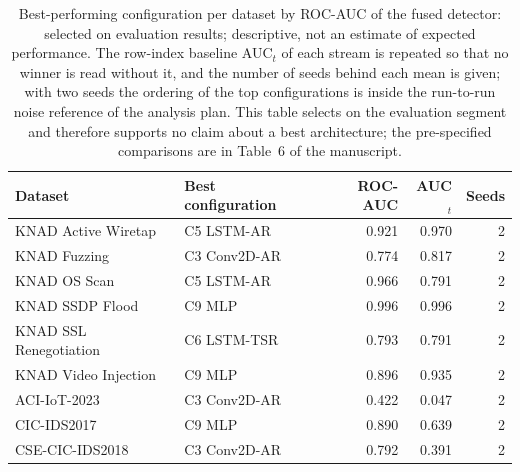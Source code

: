 \begin{table}[t]
  \centering
  \footnotesize
  \begin{tabular}{@{}llrrr@{}}
  \toprule
  Dataset & Best configuration & ROC-AUC & AUC$_t$ & Seeds \\
  \midrule
  KNAD Active Wiretap & C5 LSTM-AR & 0.921 & 0.970 & 2 \\
  KNAD Fuzzing & C3 Conv2D-AR & 0.774 & 0.817 & 2 \\
  KNAD OS Scan & C5 LSTM-AR & 0.966 & 0.791 & 2 \\
  KNAD SSDP Flood & C9 MLP & 0.996 & 0.996 & 2 \\
  KNAD SSL Renegotiation & C6 LSTM-TSR & 0.793 & 0.791 & 2 \\
  KNAD Video Injection & C9 MLP & 0.896 & 0.935 & 2 \\
  ACI-IoT-2023 & C3 Conv2D-AR & 0.422 & 0.047 & 2 \\
  CIC-IDS2017 & C9 MLP & 0.890 & 0.639 & 2 \\
  CSE-CIC-IDS2018 & C3 Conv2D-AR & 0.792 & 0.391 & 2 \\
  \bottomrule
  \end{tabular}
  \caption{Best-performing configuration per dataset by ROC-AUC of the fused detector: selected on evaluation results; descriptive, not an estimate of expected performance. The row-index baseline AUC$_t$ of each stream is repeated so that no winner is read without it, and the number of seeds behind each mean is given; with two seeds the ordering of the top configurations is inside the run-to-run noise reference of the analysis plan. This table selects on the evaluation segment and therefore supports no claim about a best architecture; the pre-specified comparisons are in Table~6 of the manuscript.}
  \label{tab:best-per-dataset}
\end{table}

